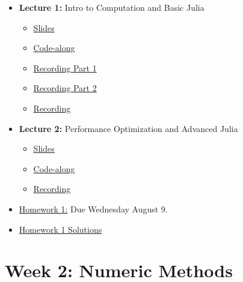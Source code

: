 \documentclass[
]{book}
\providecommand{\tightlist}{%
  \setlength{\itemsep}{0pt}\setlength{\parskip}{0pt}}
\begin{document}
\begin{itemize}
\tightlist
\item
  \textbf{Lecture 1:} Intro to Computation and Basic Julia

  \begin{itemize}
  \item
    \href{https://kevinghunt.github.io/ComputationCamp/lectures/Lecture1.html}{Slides}
  \item
    \href{https://kevinghunt.github.io/ComputationCamp/codealongs/CodeAlong1.jl}{Code-along}
  \item
    \href{https://uwmadison.zoom.us/rec/share/YbH5nwK8MFfdrG_79ab21fIChvq_GLK2G0cj1PuRpy29LgDW2ddl46KoGUvMzWoz.uN0dl820cFXMQ54_}{Recording Part 1}
  \item
    \href{https://uwmadison.zoom.us/rec/share/grQK03ljFWrQB5hBKKgoAVy9BuR5hg85PgyVvQJrXqJ5olG1fCe9vh336wh_L_yH.8-wkiBg4GIsDT3eC}{Recording Part 2}
  \item
    \href{-\%20https://uwmadison.zoom.us/rec/share/ANmR1Qr-iDoAxMOItHY9zgQk41_bbABcPN4eD3mVE5OVLvhzcXr80yBSEjEi8Dc.V7Hy_3yeHQm84srl}{Recording}
  \end{itemize}
\item
  \textbf{Lecture 2:} Performance Optimization and Advanced Julia

  \begin{itemize}
  \tightlist
  \item
    \href{https://kevinghunt.github.io/ComputationCamp/lectures/Lecture2.html}{Slides}
  \item
    \href{https://kevinghunt.github.io/ComputationCamp/codealongs/CodeAlong2.jl}{Code-along}
  \item
    \href{https://uwmadison.zoom.us/rec/share/ANmR1Qr-iDoAxMOItHY9zgQk41_bbABcPN4eD3mVE5OVLvhzcXr80yBSEjEi8Dc.V7Hy_3yeHQm84srl}{Recording}
  \end{itemize}
\item
  \href{https://kevinghunt.github.io/ComputationCamp/homeworks/homework1.html}{Homework 1:} Due Wednesday August 9.
\item
  \href{https://kevinghunt.github.io/ComputationCamp/homework_solutions/Homework1_solutions.jl}{Homework 1 Solutions}
\end{itemize}

\hypertarget{week-2-numeric-methods-1}{%
\section{Week 2: Numeric Methods}\label{week-2-numeric-methods-1}}
\end{document}
